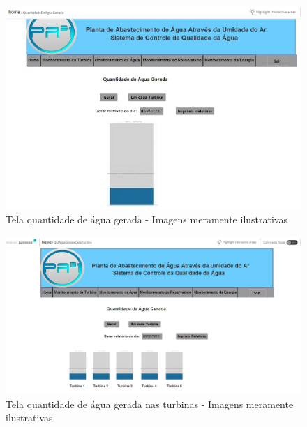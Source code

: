 \begin{center}
\begin{figure}[!ht]
\centering
\includegraphics[scale=0.5]{figuras/13}
\caption[Tela quantidade de água gerada]{Tela quantidade de água gerada - Imagens meramente ilustrativas}
\label{tela_quantidade_de_agua_geral}
\end{figure}
\clearpage

\begin{figure}[!ht]
\centering
\includegraphics[scale=0.5]{figuras/quantidade_de_agua_gerada_turbina}
\caption[Tela quantidade de água gerada nas turbinas]{Tela quantidade de água gerada nas turbinas - Imagens meramente ilustrativas}
\label{tela_quantidade_de_agua_turbinas}
\end{figure}



\end{center}
